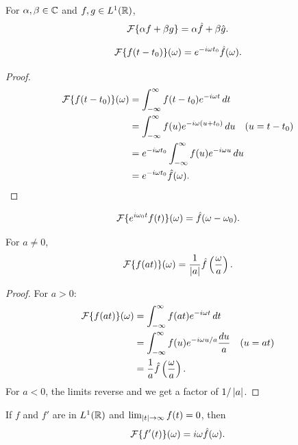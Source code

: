 \begin{notechapter}
\begin{proposition}[Linearity]
For $\alpha, \beta \in \mathbb{C}$ and $f, g \in L^1(\mathbb{R})$,
\[
\mathcal{F}\{\alpha f + \beta g\} = \alpha \hat{f} + \beta \hat{g}.
\]
\end{proposition}

\begin{proposition}
\[
\mathcal{F}\{f(t - t_0)\}(\omega) = e^{-i\omega t_0} \hat{f}(\omega).
\]
\end{proposition}

\begin{proof}
\begin{align*}
\mathcal{F}\{f(t - t_0)\}(\omega) &= \int_{-\infty}^{\infty} f(t - t_0) e^{-i\omega t} \, dt \\
&= \int_{-\infty}^{\infty} f(u) e^{-i\omega (u + t_0)} \, du \quad (u = t - t_0) \\
&= e^{-i\omega t_0} \int_{-\infty}^{\infty} f(u) e^{-i\omega u} \, du \\
&= e^{-i\omega t_0} \hat{f}(\omega).
\end{align*}
\end{proof}

\begin{proposition}
\[
\mathcal{F}\{e^{i\omega_0 t} f(t)\}(\omega) = \hat{f}(\omega - \omega_0).
\]
\end{proposition}

\begin{proposition}[Scaling]
For $a \neq 0$,
\[
\mathcal{F}\{f(at)\}(\omega) = \frac{1}{\left|a\right|} \hat{f}\left(\frac{\omega}{a}\right).
\]
\end{proposition}

\begin{proof}
For $a > 0$:
\begin{align*}
\mathcal{F}\{f(at)\}(\omega) &= \int_{-\infty}^{\infty} f(at) e^{-i\omega t} \, dt \\
&= \int_{-\infty}^{\infty} f(u) e^{-i\omega u/a} \frac{du}{a} \quad (u = at) \\
&= \frac{1}{a} \hat{f}\left(\frac{\omega}{a}\right).
\end{align*}
For $a < 0$, the limits reverse and we get a factor of $1/\left|a\right|$.
\end{proof}

\begin{proposition}
If $f$ and $f'$ are in $L^1(\mathbb{R})$ and $\lim_{\left|t\right| \to \infty} f(t) = 0$, then
\[
\mathcal{F}\{f'(t)\}(\omega) = i\omega \hat{f}(\omega).
\]
\end{proposition}


\end{notechapter}
